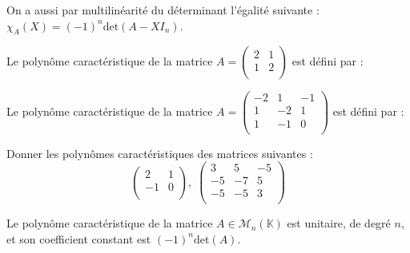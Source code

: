 \documentclass[french,11pt,twoside]{VcCours}
\begin{document}
\begin{Remarque}{}
	On a aussi par multilinéarité du déterminant l'égalité suivante : $ \chi_A(X) = (-1)^n \textrm{det}(A-XI_n)$.
\end{Remarque}

\begin{Exemple}{} Le polynôme caractéristique de la matrice $A = \begin{pmatrix}
2 & 1 \\
1 & 2 \\
\end{pmatrix}$ est défini par :
%

\vspace{3cm}
\end{Exemple}

\begin{Exemple}{} Le polynôme caractéristique de la matrice $A = \begin{pmatrix}
-2 & 1& -1  \\
1 & -2 & 1  \\
1 & -1 & 0\\
\end{pmatrix}$ est défini par :

\vspace{6cm}
\end{Exemple}

\begin{ApplicationDirecte}{} Donner les polynômes caractéristiques des matrices suivantes :
$$ \begin{pmatrix}
2 & 1 \\
-1 & 0 \\
\end{pmatrix}, \; \begin{pmatrix}
3 & 5 & -5 \\
-5 & -7 & 5 \\
-5 & -5 & 3 \\
\end{pmatrix}$$
\end{ApplicationDirecte}

\begin{Theoreme}{} Le polynôme caractéristique de la matrice $A \in \mathcal{M}_n(\mathbb{K})$ est unitaire, de degré $n$, et son coefficient constant est $(-1)^n \textrm{det}(A)$.
\end{Theoreme}
\end{document}
